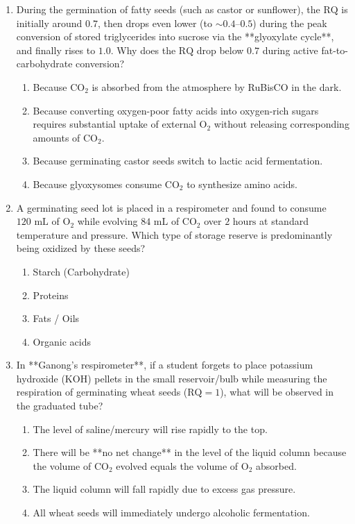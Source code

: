 \documentclass[11pt, a4paper]{article}
\begin{document}
\begin{enumerate}[label=\textbf{\arabic*.}]
\item During the germination of fatty seeds (such as castor or sunflower), the $\text{RQ}$ is initially around $0.7$, then drops even lower (to $\sim 0.4\text{--}0.5$) during the peak conversion of stored triglycerides into sucrose via the **glyoxylate cycle**, and finally rises to $1.0$. Why does the $\text{RQ}$ drop below $0.7$ during active fat-to-carbohydrate conversion?
\begin{enumerate}[label=(\Alph*)]
    \item Because $\text{CO}_2$ is absorbed from the atmosphere by RuBisCO in the dark.
    \item Because converting oxygen-poor fatty acids into oxygen-rich sugars requires substantial uptake of external $\text{O}_2$ without releasing corresponding amounts of $\text{CO}_2$.
    \item Because germinating castor seeds switch to lactic acid fermentation.
    \item Because glyoxysomes consume $\text{CO}_2$ to synthesize amino acids.
\end{enumerate}

\item A germinating seed lot is placed in a respirometer and found to consume $120\text{ mL}$ of $\text{O}_2$ while evolving $84\text{ mL}$ of $\text{CO}_2$ over $2\text{ hours}$ at standard temperature and pressure. Which type of storage reserve is predominantly being oxidized by these seeds?
\begin{enumerate}[label=(\Alph*)]
    \item Starch (Carbohydrate)
    \item Proteins
    \item Fats / Oils
    \item Organic acids
\end{enumerate}

\item In **Ganong's respirometer**, if a student forgets to place potassium hydroxide ($\text{KOH}$) pellets in the small reservoir/bulb while measuring the respiration of germinating wheat seeds ($\text{RQ} = 1$), what will be observed in the graduated tube?
\begin{enumerate}[label=(\Alph*)]
    \item The level of saline/mercury will rise rapidly to the top.
    \item There will be **no net change** in the level of the liquid column because the volume of $\text{CO}_2$ evolved equals the volume of $\text{O}_2$ absorbed.
    \item The liquid column will fall rapidly due to excess gas pressure.
    \item All wheat seeds will immediately undergo alcoholic fermentation.
\end{enumerate}


\end{enumerate}
\end{document}
